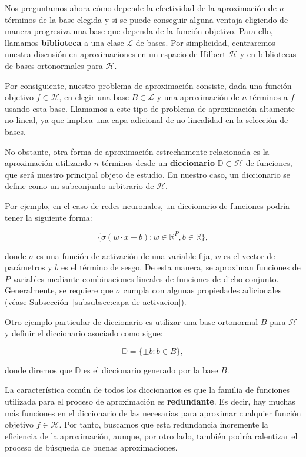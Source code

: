 Nos preguntamos ahora cómo depende la efectividad de la aproximación de $n$ términos de la base elegida y si se puede conseguir alguna ventaja eligiendo de manera progresiva una base que dependa de la función objetivo. Para ello, llamamos \textbf{biblioteca} a una clase $\mathcal{L}$ de bases. Por simplicidad, centraremos nuestra discusión en aproximaciones en un espacio de Hilbert $\mathcal{H}$ y en bibliotecas de bases ortonormales para $\mathcal{H}$.

Por consiguiente, nuestro problema de aproximación consiste, dada una función objetivo $f \in \mathcal{H}$, en elegir una base $B \in \mathcal{L}$ y una aproximación de $n$ términos a $f$ usando esta base. Llamamos a este tipo de problema de aproximación altamente no lineal, ya que implica una capa adicional de no linealidad en la selección de bases.

No obstante, otra forma de aproximación estrechamente relacionada es la aproximación utilizando $n$ términos desde un \textbf{diccionario} $\mathbb{D} \subset \mathcal{H}$ de funciones, que será nuestro principal objeto de estudio. En nuestro caso, un diccionario se define como un subconjunto arbitrario de $\mathcal{H}$.

Por ejemplo, en el caso de redes neuronales, un diccionario de funciones podría tener la siguiente forma:

\[
    \{ \sigma(w \cdot x + b) : w \in \mathbb{R}^{P}, b \in \mathbb{R} \},
\]

donde $\sigma$ es una función de activación de una variable fija, $w$ es el vector de parámetros y $b$ es el término de sesgo. De esta manera, se aproximan funciones de $P$ variables mediante combinaciones lineales de funciones de dicho conjunto. Generalmente, se requiere que $\sigma$ cumpla con algunas propiedades adicionales (véase Subsección~\ref{subsubsec:capa-de-activacion}).

Otro ejemplo particular de diccionario es utilizar una base ortonormal $B$ para $\mathcal{H}$ y definir el diccionario asociado como sigue:

\[
    \mathbb{D} = \{\pm b : b \in B\},
\]

donde diremos que $\mathbb{D}$ es el diccionario generado por la base $B$.

La característica común de todos los diccionarios es que la familia de funciones utilizada para el proceso de aproximación es \textbf{redundante}. Es decir, hay muchas más funciones en el diccionario de las necesarias para aproximar cualquier función objetivo $f \in \mathcal{H}$. Por tanto, buscamos que esta redundancia incremente la eficiencia de la aproximación, aunque, por otro lado, también podría ralentizar el proceso de búsqueda de buenas aproximaciones.


